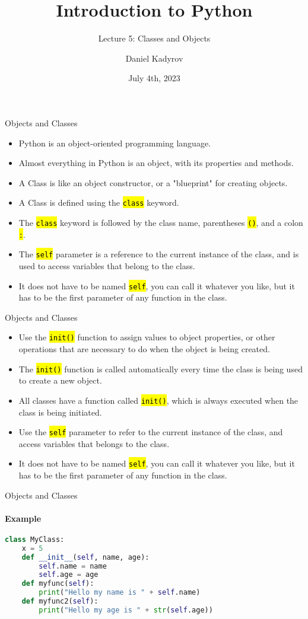 \documentclass[
    aspectratio=169, 
    usepdftitle=false, 
    xcolor={dvipsnames},
    hyperref={
        colorlinks,
        linkcolor=black,
        urlcolor=blue}
    ]{beamer}
\title[Introduction to Python]{Introduction to Python}
\subtitle{Lecture 5: Classes and Objects}
\author{Daniel Kadyrov}
\date{July 4th, 2023}
\let\OldTexttt\texttt
\renewcommand{\texttt}[1]{\OldTexttt{\hl{#1}}}%
\begin{document}
\begin{frame}
    \titlepage
\end{frame}

\begin{frame}[fragile]{Objects and Classes}
    \begin{itemize}
        \item Python is an object-oriented programming language.
        \item Almost everything in Python is an object, with its properties and methods.
        \item A Class is like an object constructor, or a "blueprint" for creating objects.
        \item A Class is defined using the \texttt{class} keyword.
        \item The \texttt{class} keyword is followed by the class name, parentheses \texttt{()}, and a colon \texttt{:}.
        \item The \texttt{self} parameter is a reference to the current instance of the class, and is used to access variables that belong to the class.
        \item It does not have to be named \texttt{self}, you can call it whatever you like, but it has to be the first parameter of any function in the class.
    \end{itemize}
\end{frame}

\begin{frame}[fragile]{Objects and Classes}
    \begin{itemize}
        \item Use the \texttt{init()} function to assign values to object properties, or other operations that are necessary to do when the object is being created.
        \item The \texttt{init()} function is called automatically every time the class is being used to create a new object.
        \item All classes have a function called \texttt{init()}, which is always executed when the class is being initiated.
        \item Use the \texttt{self} parameter to refer to the current instance of the class, and access variables that belongs to the class.
        \item It does not have to be named \texttt{self}, you can call it whatever you like, but it has to be the first parameter of any function in the class.
    \end{itemize}
\end{frame}

\begin{frame}[fragile]{Objects and Classes}
    \framesubtitle{Example}
    \begin{lstlisting}[language=Python]
class MyClass:
    x = 5
    def __init__(self, name, age):
        self.name = name
        self.age = age
    def myfunc(self):
        print("Hello my name is " + self.name)
    def myfunc2(self):
        print("Hello my age is " + str(self.age))
    \end{lstlisting}
\end{frame}
\end{document}
